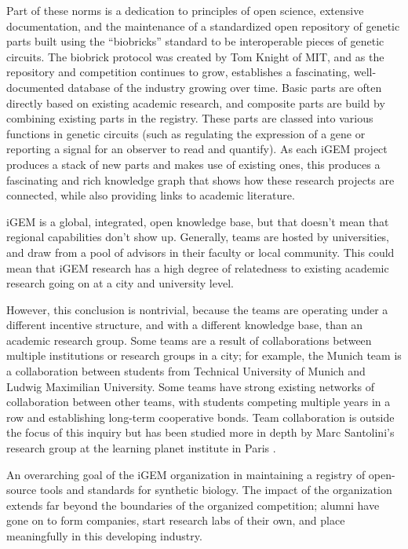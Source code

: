 \documentclass[12pt,a4paper]{article}
\begin{document}
	Part of these norms is a dedication to principles of open science, extensive documentation, and the maintenance of a standardized open repository of genetic parts built using the ``biobricks'' standard to be interoperable pieces of genetic circuits. The biobrick protocol was created by Tom Knight of MIT, and as the repository and competition continues to grow, establishes a fascinating, well-documented database of the industry growing over time. Basic parts are often directly based on existing academic research, and composite parts are build by combining existing parts in the registry. These parts are classed into various functions in genetic circuits (such as regulating the expression of a gene or reporting a signal for an observer to read and quantify). As each iGEM project produces a stack of new parts and makes use of existing ones, this produces a fascinating and rich knowledge graph that shows how these research projects are connected, while also providing links to academic literature.
	
	iGEM is a global, integrated, open knowledge base, but that doesn't mean that regional capabilities don't show up. Generally, teams are hosted by universities, and draw from a pool of advisors in their faculty or local community. This could mean that iGEM research has a high degree of relatedness to existing academic research going on at a city and university level.
	
	However, this conclusion is nontrivial, because the teams are operating under a different incentive structure, and with a different knowledge base, than an academic research group. Some teams are a result of collaborations between multiple institutions or research groups in a city; for example, the Munich team is a collaboration between students from Technical University of Munich and Ludwig Maximilian University. Some teams have strong existing networks of collaboration between other teams, with students competing multiple years in a row and establishing long-term cooperative bonds. Team collaboration is outside the focus of this inquiry but has been studied more in depth by Marc Santolini's research group at the learning planet institute in Paris \parencite{santoliniIGEMModelSystem2023}.
	
	An overarching goal of the iGEM organization in maintaining a registry of open-source tools and standards for synthetic biology. The impact of the organization extends far beyond the boundaries of the organized competition; alumni have gone on to form companies, start research labs of their own, and place meaningfully in this developing industry.
	
\end{document}
